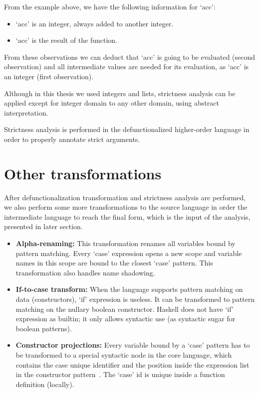 \documentclass[diploma]{softlab-thesis}
\begin{document}
From the example above, we have the following information for `acc':
\begin{itemize}
  \item `acc' is an integer, always added to another integer.
  \item `acc' is the result of the function.
\end{itemize}

From these observations we can deduct that `acc' is going to be evaluated (second observation) and 
all intermediate values are needed for its evaluation, as `acc' is an integer (first observation).
\newline
\par Although in this thesis we used integers and lists, strictness analysis can be applied except for 
integer domain to any other domain, using abstract interpretation.
\newline
\par Strictness analysis is performed in the defunctionalized higher-order language in order to 
properly annotate strict arguments.

\section {Other transformations}
\label{sec:other-transformations}

After defunctionalization transformation and strictness analysis are performed, we also 
perform some more transformations to the source language in order the intermediate 
language to reach the final form, which is the input of the analysis, presented in later section.


\begin{itemize}
  \item \textbf{Alpha-renaming:}  This transformation renames all variables bound by pattern matching.
  Every `case' expression opens a new scope and variable names in this scope are bound to the closest 
  `case' pattern. This transformation also handles name shadowing. 
  \item \textbf{If-to-case transform:}  When the language supports pattern matching on data 
  (constructors), `if' expression is useless. It can be transformed to pattern matching on 
  the nullary boolean constructor. Haskell does not have `if' expression as builtin; it only allows
  syntactic use (as syntactic sugar for boolean patterns).
  \item \textbf{Constructor projections:}  Every variable bound by a `case' pattern has to be 
  transformed to a special syntactic node in the core language, which contains the case unique identifier
  and the position inside the expression list in the constructor pattern~\cite{Fourtounis:2013:GIT:2769663.2769674}. The `case' id is 
  unique inside a function definition (locally).
\end{itemize}
\end{document}
